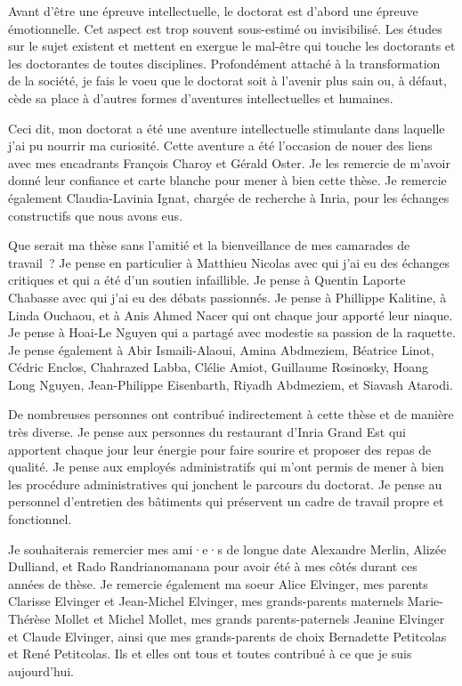 \begin{ThesisAcknowledgments}
Avant d'être une épreuve intellectuelle, le doctorat est d'abord une épreuve émotionnelle.
Cet aspect est trop souvent sous-estimé ou invisibilisé.
Les études sur le sujet existent et mettent en exergue le mal-être qui touche les doctorants et les doctorantes de toutes disciplines.
Profondément attaché à la transformation de la société, je fais le voeu que le doctorat soit à l'avenir plus sain ou, à défaut, cède sa place à d'autres formes d'aventures intellectuelles et humaines.

Ceci dit, mon doctorat a été une aventure intellectuelle stimulante dans laquelle j'ai pu nourrir ma curiosité.
Cette aventure a été l'occasion de nouer des liens avec mes encadrants François Charoy et Gérald Oster.
Je les remercie de m'avoir donné leur confiance et carte blanche pour mener à bien cette thèse.
Je remercie également Claudia-Lavinia Ignat, chargée de recherche à Inria, pour les échanges constructifs que nous avons eus.

Que serait ma thèse sans l'amitié et la bienveillance de mes camarades de travail~?
Je pense en particulier à Matthieu Nicolas avec qui j'ai eu des échanges critiques et qui a été d'un soutien infaillible.
Je pense à Quentin Laporte Chabasse avec qui j'ai eu des débats passionnés.
Je pense à Phillippe Kalitine, à Linda Ouchaou, et à Anis Ahmed Nacer qui ont chaque jour apporté leur niaque.
Je pense à Hoai-Le Nguyen qui a partagé avec modestie sa passion de la raquette.
Je pense également à Abir Ismaili-Alaoui, Amina Abdmeziem, Béatrice Linot, Cédric Enclos, Chahrazed Labba, Clélie Amiot, Guillaume Rosinosky, Hoang Long Nguyen, Jean-Philippe Eisenbarth, Riyadh Abdmeziem, et Siavash Atarodi.

De nombreuses personnes ont contribué indirectement à cette thèse et de manière très diverse.
Je pense aux personnes du restaurant d'Inria Grand Est qui apportent chaque jour leur énergie pour faire sourire et proposer des repas de qualité.
Je pense aux employés administratifs qui m'ont permis de mener à bien les procédure administratives qui jonchent le parcours du doctorat.
Je pense au personnel d'entretien des bâtiments qui préservent un cadre de travail propre et fonctionnel.

Je souhaiterais remercier mes ami·e·s de longue date Alexandre Merlin, Alizée Dulliand, et Rado Randrianomanana pour avoir été à mes côtés durant ces années de thèse.
Je remercie également ma soeur Alice Elvinger, mes parents Clarisse Elvinger et Jean-Michel Elvinger, mes grands-parents maternels Marie-Thérèse Mollet et Michel Mollet, mes grands parents-paternels Jeanine Elvinger et Claude Elvinger, ainsi que mes grands-parents de choix Bernadette Petitcolas et René Petitcolas.
Ils et elles ont tous et toutes contribué à ce que je suis aujourd'hui.
\end{ThesisAcknowledgments}
